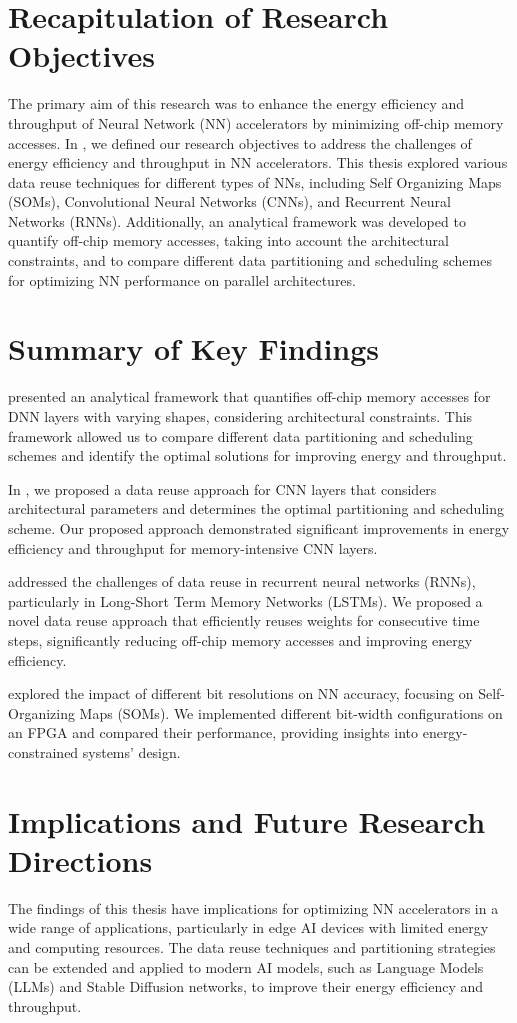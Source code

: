 \section{Recapitulation of Research Objectives}
The primary aim of this research was to enhance the energy efficiency and throughput of Neural Network (NN) accelerators by minimizing off-chip memory accesses. In , we defined our research objectives to address the challenges of energy efficiency and throughput in NN accelerators. This thesis explored various data reuse techniques for different types of NNs, including Self Organizing Maps (SOMs), Convolutional Neural Networks (CNNs), and Recurrent Neural Networks (RNNs). Additionally, an analytical framework was developed to quantify off-chip memory accesses, taking into account the architectural constraints, and to compare different data partitioning and scheduling schemes for optimizing NN performance on parallel architectures. 

\section{Summary of Key Findings}
 presented an analytical framework that quantifies off-chip memory accesses for DNN layers with varying shapes, considering architectural constraints. This framework allowed us to compare different data partitioning and scheduling schemes and identify the optimal solutions for improving energy and throughput.

In , we proposed a data reuse approach for CNN layers that considers architectural parameters and determines the optimal partitioning and scheduling scheme. Our proposed approach demonstrated significant improvements in energy efficiency and throughput for memory-intensive CNN layers.

 addressed the challenges of data reuse in recurrent neural networks (RNNs), particularly in Long-Short Term Memory Networks (LSTMs). We proposed a novel data reuse approach that efficiently reuses weights for consecutive time steps, significantly reducing off-chip memory accesses and improving energy efficiency.

 explored the impact of different bit resolutions on NN accuracy, focusing on Self-Organizing Maps (SOMs). We implemented different bit-width configurations on an FPGA and compared their performance, providing insights into energy-constrained systems' design.
\section{Implications and Future Research Directions}
The findings of this thesis have implications for optimizing NN accelerators in a wide range of applications, particularly in edge AI devices with limited energy and computing resources. The data reuse techniques and partitioning strategies can be extended and applied to modern AI models, such as Language Models (LLMs) and Stable Diffusion networks, to improve their energy efficiency and throughput.

